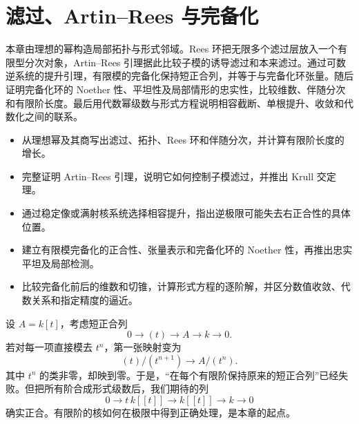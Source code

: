 
% 
% 

\chapter{滤过、Artin–Rees 与完备化}
\label{g5:ch:07}

\begin{chapterabstract}
	本章由理想的幂构造局部拓扑与形式邻域。Rees 环把无限多个滤过层放入一个有限型分次对象，Artin–Rees 引理据此比较子模的诱导滤过和本来滤过。通过可数逆系统的提升引理，有限模的完备化保持短正合列，并等于与完备化环张量。随后证明完备化环的 Noether 性、平坦性及局部情形的忠实性，比较维数、伴随分次和有限阶长度。最后用代数幂级数与形式方程说明相容截断、单根提升、收敛和代数化之间的联系。
\end{chapterabstract}

\begin{learninggoals}
	\begin{itemize}
		\item 从理想幂及其商写出滤过、拓扑、Rees 环和伴随分次，并计算有限阶长度的增长。
		\item 完整证明 Artin–Rees 引理，说明它如何控制子模滤过，并推出 Krull 交定理。
		\item 通过稳定像或满射核系统选择相容提升，指出逆极限可能失去右正合性的具体位置。
		\item 建立有限模完备化的正合性、张量表示和完备化环的 Noether 性，再推出忠实平坦及局部检测。
		\item 比较完备化前后的维数和切锥，计算形式方程的逐阶解，并区分数值收敛、代数关系和指定精度的逼近。
	\end{itemize}
\end{learninggoals}

设 \(A=k[t]\)，考虑短正合列
\[
	0\longrightarrow(t)\longrightarrow A\longrightarrow k\longrightarrow0.
\]
若对每一项直接模去 \(t^n\)，第一张映射变为
\[
	(t)/(t^{n+1})\longrightarrow A/(t^n).
\]
其中 \(t^n\) 的类非零，却映到零。于是，“在每个有限阶保持原来的短正合列”已经失败。但把所有阶合成形式级数后，我们期待的列
\[
	0\longrightarrow t\,k[[t]]\longrightarrow k[[t]]
	\longrightarrow k\longrightarrow0
\]
确实正合。有限阶的核如何在极限中得到正确处理，是本章的起点。

